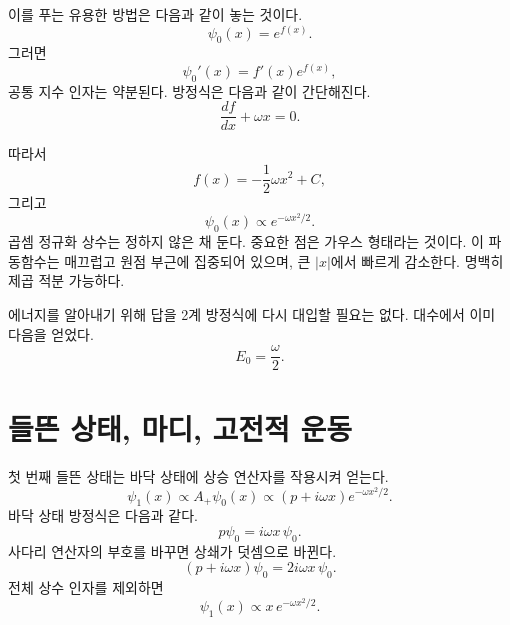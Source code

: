 이를 푸는 유용한 방법은 다음과 같이 놓는 것이다.
\begin{equation}
\psi_{0}(x)=e^{f(x)}.
\end{equation}
그러면
\[
\psi_{0}'(x)=f'(x)e^{f(x)},
\]
공통 지수 인자는 약분된다. 방정식은 다음과 같이 간단해진다.
\begin{equation}
\frac{df}{dx}+\omega x=0.
\end{equation}

\begin{classroomqa}
\end{classroomqa}

따라서
\begin{equation}
f(x)=-\frac12\omega x^{2}+C,
\end{equation}
그리고
\begin{equation}
\psi_{0}(x)\propto e^{-\omega x^{2}/2}.
\end{equation}
곱셈 정규화 상수는 정하지 않은 채 둔다. 중요한 점은 가우스 형태라는 것이다. 이 파동함수는 매끄럽고 원점 부근에 집중되어 있으며, 큰 \(\lvert x\rvert\)에서 빠르게 감소한다. 명백히 제곱 적분 가능하다.

에너지를 알아내기 위해 답을 2계 방정식에 다시 대입할 필요는 없다. 대수에서 이미 다음을 얻었다.
\begin{equation}
E_{0}=\frac{\omega}{2}.
\end{equation}

\section{들뜬 상태, 마디, 고전적 운동}

첫 번째 들뜬 상태는 바닥 상태에 상승 연산자를 작용시켜 얻는다.
\begin{equation}
\psi_{1}(x)\propto A_{+}\psi_{0}(x)
\propto(p+i\omega x)e^{-\omega x^{2}/2}.
\end{equation}
바닥 상태 방정식은 다음과 같다.
\[
p\psi_{0}=i\omega x\,\psi_{0}.
\]
사다리 연산자의 부호를 바꾸면 상쇄가 덧셈으로 바뀐다.
\begin{equation}
(p+i\omega x)\psi_{0}
=2i\omega x\,\psi_{0}.
\end{equation}
전체 상수 인자를 제외하면
\begin{equation}
\psi_{1}(x)\propto x\,e^{-\omega x^{2}/2}.
\end{equation}

